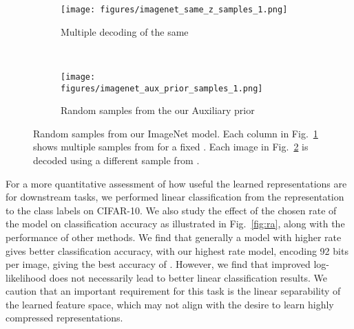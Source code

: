 \documentclass{article} \usepackage{iclr2019_conference,times}
\def\figref#1{figure~\ref{#1}}
\renewcommand{\figref}[1]{Fig.~\ref{#1}}
\begin{document}
\begin{figure}[h]
    \centering
    \begin{subfigure}{0.49\textwidth}
        \centering
        \texttt{[image: figures/imagenet\_same\_z\_samples\_1.png]}
        \caption{Multiple decoding of the same }        
        \label{fig:imagenet-samez}
    \end{subfigure}
    ~
    \begin{subfigure}{0.49\textwidth}
        \centering
        \texttt{[image: figures/imagenet\_aux\_prior\_samples\_1.png]}
        \caption{Random samples from the our Auxiliary prior}
        \label{fig:imagenet-aux}
    \end{subfigure}
    \caption{Random samples from our ImageNet  model. Each column in \figref{fig:imagenet-samez} shows multiple samples from  for a fixed . Each image in \figref{fig:imagenet-aux} is decoded using a different sample from .}
    \label{fig:samples-samez}
\end{figure}

For a more quantitative assessment of how useful the learned representations are for downstream tasks, we performed linear classification from the representation to the class labels on CIFAR-10. We also study the effect of the chosen rate of the model on classification accuracy as illustrated in \figref{fig:ra}, along with the performance of other methods. We find that generally a model with higher rate gives better classification accuracy, with our highest rate model, encoding 92 bits per image, giving the best accuracy of . However, we find that improved log-likelihood does not necessarily lead to better linear classification results.  We caution that an important requirement for this task is the linear separability of the learned feature space, which may not align with the desire to learn highly compressed representations.
\end{document}
